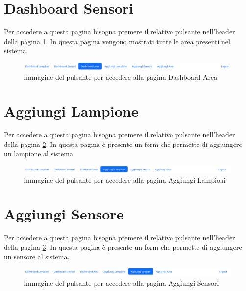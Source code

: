 \section{Dashboard Sensori}

Per accedere a questa pagina bisogna premere il relativo pulsante nell'header della pagina \ref{fig:dash_area}. In questa pagina vengono mostrati tutte le area presenti nel sistema.

\begin{figure}[ht]
    \centering
    \includegraphics[width=\textwidth]{img/dash_area.png}
    \caption{Immagine del pulsante per accedere alla pagina Dashboard Area}
    \label{fig:dash_area}
\end{figure}

\section{Aggiungi Lampione}

Per accedere a questa pagina bisogna premere il relativo pulsante nell'header della pagina \ref{fig:form_lamp}. In questa pagina è presente un form che permette di aggiungere un lampione al sistema.

\begin{figure}[ht]
    \centering
    \includegraphics[width=\textwidth]{img/form_lamp.png}
    \caption{Immagine del pulsante per accedere alla pagina Aggiungi Lampioni}
    \label{fig:form_lamp}
\end{figure}

\section{Aggiungi Sensore}

Per accedere a questa pagina bisogna premere il relativo pulsante nell'header della pagina \ref{fig:form_sens}. In questa pagina è presente un form che permette di aggiungere un sensore al sistema.

\begin{figure}[ht]
    \centering
    \includegraphics[width=\textwidth]{img/form_sens.png}
    \caption{Immagine del pulsante per accedere alla pagina Aggiungi Sensori}
    \label{fig:form_sens}
\end{figure}

